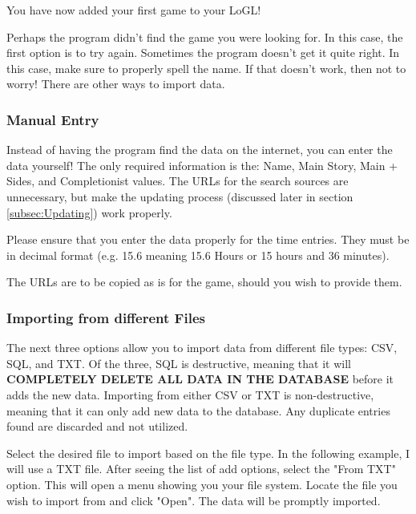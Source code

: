 
You have now added your first game to your LoGL!

Perhaps the program didn't find the game you were looking for. In
this case, the first option is to try again. Sometimes the program
doesn't get it quite right. In this case, make sure to properly spell the name.
If that doesn't work, then not to worry! There are other ways to import data.

\subsubsection{Manual Entry}

Instead of having the program find the data on the internet, you can
enter the data yourself! The only required information is the: Name,
Main Story, Main + Sides, and Completionist values. The URLs for the
search sources are unnecessary, but make the updating process
(discussed later in section \ref{subsec:Updating}) work properly.

Please ensure that you enter the data properly for the time entries.
They must be in decimal format (e.g. 15.6 meaning 15.6 Hours or 15
hours and 36 minutes).

The URLs are to be copied as is for the game, should you wish to provide them.



\subsubsection{Importing from different Files}

The next three options allow you to import data from different file
types: CSV, SQL, and TXT. Of the three, SQL is destructive, meaning
that it will \textbf{COMPLETELY DELETE ALL DATA IN THE DATABASE}
before it adds the new data. Importing from either CSV or TXT is
non-destructive, meaning that it can only add new data to the
database. Any duplicate entries found are discarded and not utilized.

Select the desired file to import based on the file type. In the
following example, I will use a TXT file. After seeing the list of
add options, select the "From TXT" option. This will open a menu
showing you your file system. Locate the file you wish to import from
and click "Open". The data will be promptly imported.

